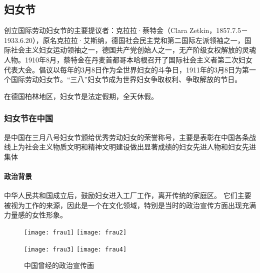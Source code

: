 \subsection{妇女节}

创立国际劳动妇女节的主要提议者：克拉拉·蔡特金（Clara Zetkin，1857.7.5－1933.6.20），原名克拉拉·艾斯纳，德国社会民主党和第二国际左派领袖之一，国际社会主义妇女运动领袖之一，德国共产党创始人之一，无产阶级女权解放的灵魂人物。1910年8月，蔡特金在丹麦首都哥本哈根召开了国际社会主义者第二次妇女代表大会。倡议以每年的3月8日作为全世界妇女的斗争日，1911年的3月8日为第一个国际劳动妇女节。“三八”妇女节成为世界妇女争取权利、争取解放的节日。

在德国柏林地区，妇女节是法定假期，全天休假。

\subsubsection[三八红旗手]{妇女节在中国}
是中国在三月八号妇女节颁给优秀劳动妇女的荣誉称号，主要是表彰在中国各条战线上为社会主义物质文明和精神文明建设做出显著成绩的妇女先进人物和妇女先进集体

\paragraph{政治背景}
中华人民共和国成立后，鼓励妇女进入工厂工作，离开传统的家庭区。 它们主要被视为工作的来源，因此是一个在文化领域，特别是当时的政治宣传方面出现充满力量感的女性形象。
\begin{figure}[htb]
    \centering
    \texttt{[image: frau1]}
    \texttt{[image: frau2]}
    
    \texttt{[image: frau3]}
    \texttt{[image: frau4]}
    \caption{中国曾经的政治宣传画}
\end{figure}